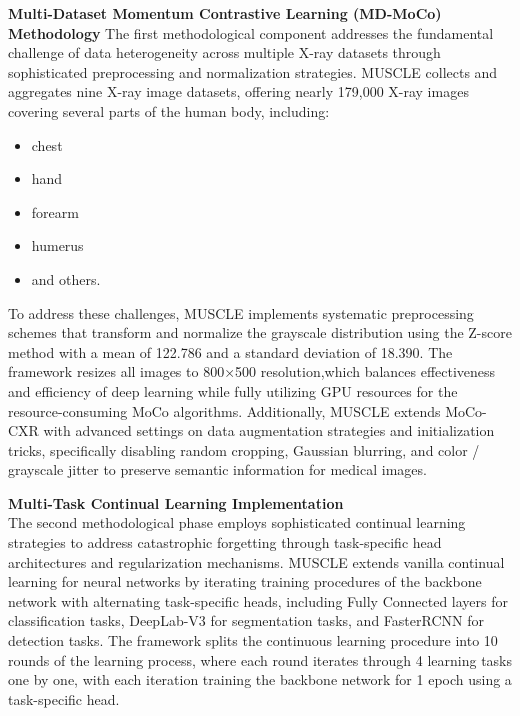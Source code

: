 \documentclass{IEEEcsmag}
\begin{document}
    \textbf{Multi-Dataset Momentum Contrastive Learning (MD-MoCo) Methodology}\newline
    The first methodological component addresses the fundamental challenge of data heterogeneity across multiple X-ray datasets through sophisticated preprocessing and normalization strategies. 
    MUSCLE collects and aggregates nine X-ray image datasets, offering nearly 179,000 X-ray images covering several parts of the human body\cite{cite-17}, including:
    \begin{itemize}
        \item chest
        \item hand
        \item forearm
        \item humerus
        \item and others.
    \end{itemize}
    
    To address these challenges, MUSCLE implements systematic preprocessing schemes that transform and normalize the grayscale distribution using the Z-score method with a mean of 122.786 and a standard deviation of 18.390.
    The framework resizes all images to 800×500 resolution,which balances effectiveness and efficiency of deep learning while fully utilizing GPU resources for the resource-consuming MoCo algorithms. 
    Additionally, MUSCLE extends MoCo-CXR with advanced settings on data augmentation strategies and initialization tricks, specifically disabling random cropping, Gaussian blurring, and color / grayscale jitter to preserve semantic information for medical images\cite{cite-17}.
    
    \textbf{Multi-Task Continual Learning Implementation}\\
    The second methodological phase employs sophisticated continual learning strategies to address catastrophic forgetting through task-specific head architectures and regularization mechanisms. 
    MUSCLE extends vanilla continual learning for neural networks by iterating training procedures of the backbone network with alternating task-specific heads, including Fully Connected layers for classification tasks, DeepLab-V3 for segmentation tasks, and FasterRCNN for detection tasks\cite{cite-17}. 
    The framework splits the continuous learning procedure into 10 rounds of the learning process, where each round iterates through 4 learning tasks one by one, with each iteration training the backbone network for 1 epoch using a task-specific head\cite{cite-17}.
    
\end{document}

